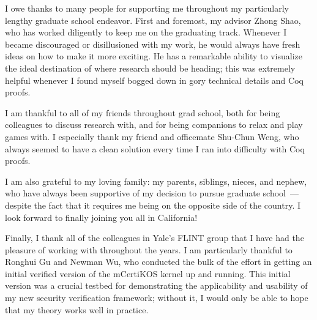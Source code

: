 I owe thanks to many people for supporting me throughout my
particularly lengthy graduate school endeavor. First and foremost, my
advisor Zhong Shao, who has worked diligently to keep me on the
graduating track. Whenever I became discouraged or disillusioned
with my work, he would always have fresh ideas on how to make it
more exciting. He has a remarkable ability to visualize the ideal destination
of where research should be heading; this was extremely helpful 
whenever I found myself bogged down in gory technical details and Coq proofs.

I am thankful to all of my friends throughout grad school, both
for being colleagues to discuss research with, and for being
companions to relax and play games with. I especially thank 
my friend and officemate Shu-Chun Weng, who always seemed to have 
a clean solution every time I ran into difficulty with Coq proofs.

I am also grateful to my loving family: my parents, siblings, nieces, 
and nephew, who have 
always been supportive of my decision to pursue graduate school~--- despite 
the fact that it requires me being on the opposite side of the country. I 
look forward to finally joining you all in California!

Finally, I thank all of the colleagues in Yale's FLINT group that I have had
the pleasure of working with throughout the years. I am particularly thankful
to Ronghui Gu and Newman Wu, who conducted the bulk of the effort in getting 
an initial verified version of the mCertiKOS kernel up and running. This
initial version was a crucial testbed for demonstrating the applicability
and usability of my new security verification framework; without it, I would
only be able to hope that my theory works well in practice.
